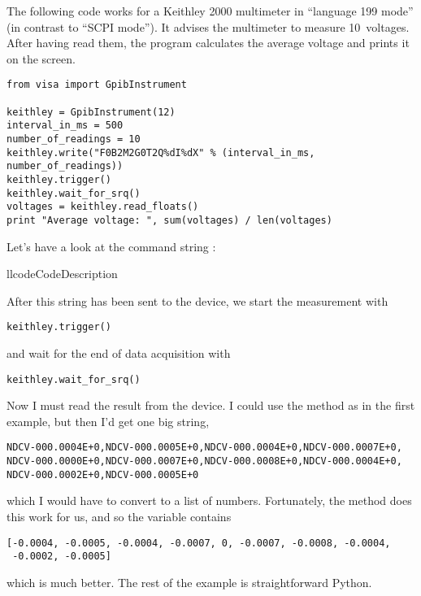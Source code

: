 \documentclass{howto}
\begin{document}
The following code works for a Keithley 2000 multimeter in ``language 199
mode'' (in contrast to ``SCPI mode'').  It advises the multimeter to measure
10~voltages.  After having read them, the program calculates the average
voltage and prints it on the screen.
\begin{verbatim}
from visa import GpibInstrument

keithley = GpibInstrument(12)
interval_in_ms = 500
number_of_readings = 10
keithley.write("F0B2M2G0T2Q%dI%dX" % (interval_in_ms, number_of_readings))
keithley.trigger()
keithley.wait_for_srq()
voltages = keithley.read_floats()
print "Average voltage: ", sum(voltages) / len(voltages)
\end{verbatim}
Let's have a look at the command string :
\begin{tableii}{ll}{code}{Code}{Description}
\end{tableii}

After this string has been sent to the device, we start the measurement with
\begin{verbatim}
keithley.trigger()
\end{verbatim}
and wait for the end of data acquisition with
\begin{verbatim}
keithley.wait_for_srq()
\end{verbatim}
Now I must read the result from the device.  I could use the 
method as in the first example, but then I'd get one big string,
\begin{verbatim}
NDCV-000.0004E+0,NDCV-000.0005E+0,NDCV-000.0004E+0,NDCV-000.0007E+0,
NDCV-000.0000E+0,NDCV-000.0007E+0,NDCV-000.0008E+0,NDCV-000.0004E+0,
NDCV-000.0002E+0,NDCV-000.0005E+0
\end{verbatim}
which I would have to convert to a list of numbers.  Fortunately, the
 method does this work for us, and so the variable
 contains
\begin{verbatim}
[-0.0004, -0.0005, -0.0004, -0.0007, 0, -0.0007, -0.0008, -0.0004,
 -0.0002, -0.0005]
\end{verbatim}
which is much better.  The rest of the example is straightforward Python.
\end{document}
